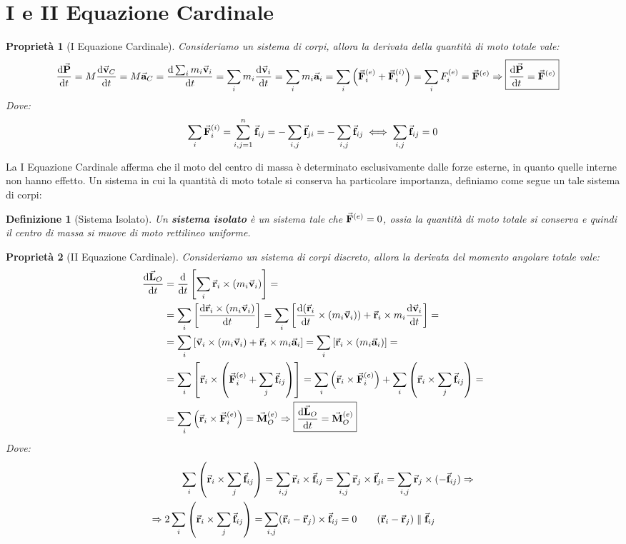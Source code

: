 \documentclass{article}
\newtheorem{property}{Proprietà}[section]
\newtheorem{defn}{Definizione}[section]
\newcommand{\note}{\noindent {\quad \bf \underline{Osservazione:}} \quad}
\newcommand{\then}{\ensuremath{\Rightarrow}}
\renewcommand{\a}{\va{a}}
\renewcommand{\v}{\va{v}}
\renewcommand{\r}{\va{r}}
\newcommand{\F}{\va{F}}
\newcommand{\f}{\va{f}}
\newcommand{\M}{\va{M}}
\renewcommand{\P}{\va{P}}
\renewcommand{\L}{\va{L}}
\begin{document}
\section{I e II Equazione Cardinale}
\begin{property}[I Equazione Cardinale]
Consideriamo un sistema di corpi, allora la derivata della quantità di moto totale vale:
\begin{equation}
\begin{split}
    \dv{\P}{t}=M\dv{\v_C}{t}&=M\a_C=\dv{\sum_im_i\v_i}{t}=\sum_im_i\dv{\v_i}{t}=\sum_im_i\a_i=\sum_i\left(\F_i^{(e)}+\F_i^{(i)}\right)=\sum_iF_i^{(e)}=\F^{(e)}\then \boxed{\dv{\P}{t}=\F^{(e)}}
\end{split}    
\end{equation}
Dove:
\[\sum_i\F_i^{(i)}=\sum_{i,j=1}^n\f_{ij}=-\sum_{i,j}\f_{ji}=-\sum_{i,j}\f_{ij}\iff \sum_{i,j}\f_{ij}=0\]
\end{property}
\note La I Equazione Cardinale afferma che il moto del centro di massa è determinato esclusivamente dalle forze esterne, in quanto quelle interne non hanno effetto. 
Un sistema in cui la quantità di moto totale si conserva ha particolare importanza, definiamo come segue un tale sistema di corpi:
\begin{defn}[Sistema Isolato]
Un \textbf{sistema isolato} è un sistema tale che $\F^{(e)}=0$, ossia la quantità di moto totale si conserva e quindi il centro di massa si muove di moto rettilineo uniforme.
\end{defn}
\begin{property}[II Equazione Cardinale]
Consideriamo un sistema di corpi discreto, allora la derivata del momento angolare totale vale:
\begin{equation}
\begin{split}
\dv{\L_O}{t}&=\dv{}{t}\left[\sum_i\r_i\times(m_i\v_i)\right]=\\
&=\sum_i\left[\dv{\r_i\times(m_i\v_i)}{t}\right]=\sum_i\left[\dv{(\r_i}{t}\times(m_i\v_i))+\r_i\times m_i\dv{\v_i}{t}\right]=\\
&=\sum_i\left[\v_i\times(m_i\v_i)+\r_i\times m_i\a_i\right]=\sum_i\left[\r_i\times(m_i\a_i)\right]=\\
&=\sum_i\left[\r_i\times\left(\F_i^{(e)}+\sum_j\f_{ij}\right)\right]=\sum_i\left(\r_i\times\F_i^{(e)}\right)+\sum_{i}\left(\r_i\times\sum_j\f_{ij}\right)=\\
&=\sum_i\left(\r_i\times\F_i^{(e)}\right)=\M_O^{(e)}\then \boxed{\dv{\L_O}{t}=\M_O^{(e)}}
\end{split}
\end{equation}
Dove:
\begin{equation}
\begin{split}
    \sum_i\left(\r_i\times\sum_j\f_{ij}\right)&=\sum_{i,j}\r_i\times\f_{ij}=\sum_{i,j}\r_j\times\f_{ji}=\sum_{i,j}\r_j\times(-\f_{ij})\then\\ 
    \then 2\sum_i\left(\r_i\times\sum_j\f_{ij}\right)=&\sum_{i,j}(\r_i-\r_j)\times\f_{ij}=0\quad\quad (\r_i-\r_j)\parallel\f_{ij}
\end{split}
\end{equation}
\end{property}
\end{document}
